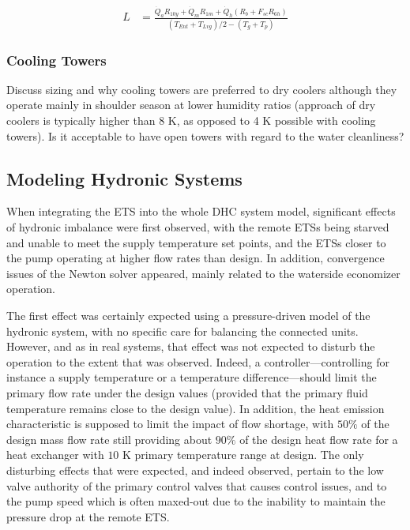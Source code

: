 \begin{align}
    \label{eq:sizing}
    L &= \frac{\dot{Q}_a R_{10y} + \dot{Q}_m R_{1m} + \dot{Q}_h \left( R_b + F_{sc} R_{6h} \right)}{\left( T_{Ent} + T_{Lvg} \right) / 2 - \left( T_g + T_p \right)}
\end{align}


\subsubsection{Cooling Towers}

Discuss sizing and why cooling towers are preferred to dry coolers although they operate mainly in shoulder season at lower humidity ratios (approach of dry coolers is typically higher than 8 K, as opposed to 4 K possible with cooling towers). Is it acceptable to have open towers with regard to the water cleanliness?

\subsection{Modeling Hydronic Systems} \label{sec:balancing}

When integrating the ETS into the whole DHC system model, significant effects of hydronic imbalance were first observed, with the remote ETSs being starved and unable to meet the supply temperature set points, and the ETSs closer to the pump operating at higher flow rates than design.
In addition, convergence issues of the Newton solver appeared, mainly related to the waterside economizer operation.

The first effect was certainly expected using a pressure-driven model of the hydronic system, with no specific care for balancing the connected units. However, and as in real systems, that effect was not expected to disturb the operation to the extent that was observed. Indeed, a controller---controlling for instance a supply temperature or a temperature difference---should limit the primary flow rate under the design values (provided that the primary fluid temperature remains close to the design value). In addition, the heat emission characteristic is supposed to limit the impact of flow shortage, with $50\%$ of the design mass flow rate still providing about $90\%$ of the design heat flow rate for a heat exchanger with $10$ K primary temperature range at design. The only disturbing effects that were expected, and indeed observed, pertain to the low valve authority of the primary control valves that causes control issues, and to the pump speed which is often maxed-out due to the inability to maintain the pressure drop at the remote ETS.


